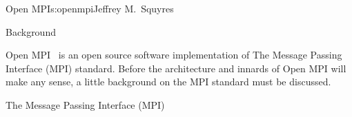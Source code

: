 \begin{aosachapter}{Open MPI}{s:openmpi}{Jeffrey M.\ Squyres}





\begin{aosasect1}{Background}


Open MPI~\cite{gabriel04:_open_mpi} is an open source software
implementation of The Message Passing Interface (MPI) standard.
%
Before the architecture and innards of Open MPI will make any sense,
a little background on the MPI standard must be discussed.


\begin{aosasect2}{The Message Passing Interface (MPI)}


\end{aosasect2}
\end{aosasect1}
\end{aosachapter}
